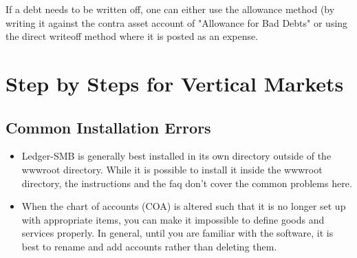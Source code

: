 \documentclass{article}
\begin{document}
If a debt needs to be written off, one can either use the allowance method (by
writing it against the contra asset account of "Allowance for Bad Debts" or
using the direct writeoff method where it is posted as an expense.

\section{Step by Steps for Vertical Markets}
\subsection{Common Installation Errors}
\begin{itemize}
\item Ledger-SMB is generally best installed in its own directory outside of the
wwwroot directory.  While it is possible to install it inside the wwwroot
directory, the instructions and the faq don't cover the common problems here.
\item When the chart of accounts (COA) is altered such that it is no longer set
up with appropriate items, you can make it impossible to define goods and
services properly.  In general, until you are familiar with the software, it is
best to rename and add accounts rather than deleting them.
\end{itemize}
\end{document}
